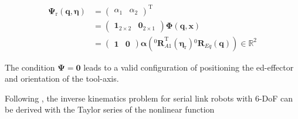 \documentclass[twocolumn,10pt]{IFTOMM}
\newcommand{\bm}[1]{\boldsymbol{#1}}
\newcommand{\rotmat}[2]{{{ }^{#1}\boldsymbol{R}}_{#2}}
\newcommand{\transp}[0]{{\mathrm{T}}}
\begin{document}
\begin{align}
\bm{\Psi}_{\mathrm{r}}(\bm{q},\bm{\eta}) &= 
\begin{pmatrix}
\alpha_1  & \alpha_2
\end{pmatrix}^\transp  \\
&=
\begin{pmatrix} \bm{1}_{2 \times 2} & \bm{0}_{2 \times 1}\end{pmatrix} \bm{\Phi} (\bm{q},\bm{x}) \\
&= \begin{pmatrix} \bm{1} & \bm{0}\end{pmatrix} \bm{\alpha}\left(\rotmat{0}{A1}^\transp (\bm{\eta}_{\mathrm{r}})\rotmat{0}{Eq}(\bm{q})\right) \in {\mathbb{R}}^{2}
\end{align}

The condition $\bm{\Psi}=\bm{0}$ leads to a valid configuration of positioning the ed-effector and orientation of the tool-axis.




%
%
%




Following \cite{GoldenbergBenFen1985}, the inverse kinematics problem for serial link robots with 6-DoF can be derived with the Taylor series of the nonlinear function 
\end{document}
